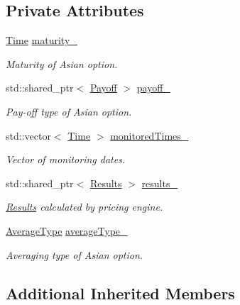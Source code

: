 \subsection*{Private Attributes}
\begin{DoxyCompactItemize}
\item 
\hyperlink{_name_def_8h_ac2d3e0ba793497bcca555c7c2cf64ff3}{Time} \hyperlink{class_asian_option_aff2f0be31b55a1b859cde9ee9b339075}{maturity\+\_\+}
\begin{DoxyCompactList}\small\item\em Maturity of Asian option. \end{DoxyCompactList}\item 
std\+::shared\+\_\+ptr$<$ \hyperlink{class_payoff}{Payoff} $>$ \hyperlink{class_asian_option_abb0ef9b7f812435dcf24e4dd8edb2be2}{payoff\+\_\+}
\begin{DoxyCompactList}\small\item\em Pay-\/off type of Asian option. \end{DoxyCompactList}\item 
std\+::vector$<$ \hyperlink{_name_def_8h_ac2d3e0ba793497bcca555c7c2cf64ff3}{Time} $>$ \hyperlink{class_asian_option_a8cc25f4cabd8ceac95a69598481f18c8}{monitored\+Times\+\_\+}
\begin{DoxyCompactList}\small\item\em Vector of monitoring dates. \end{DoxyCompactList}\item 
std\+::shared\+\_\+ptr$<$ \hyperlink{class_asian_option_1_1_results}{Results} $>$ \hyperlink{class_asian_option_aea29a8aff78cbe4101b4f060cedb6307}{results\+\_\+}
\begin{DoxyCompactList}\small\item\em \hyperlink{class_asian_option_1_1_results}{Results} calculated by pricing engine. \end{DoxyCompactList}\item 
\hyperlink{class_asian_option_add7292791bf85820ff9fdbfd4407f3b9}{Average\+Type} \hyperlink{class_asian_option_a602d4f41bc033a8242a0641cf5104045}{average\+Type\+\_\+}
\begin{DoxyCompactList}\small\item\em Averaging type of Asian option. \end{DoxyCompactList}\end{DoxyCompactItemize}
\subsection*{Additional Inherited Members}


